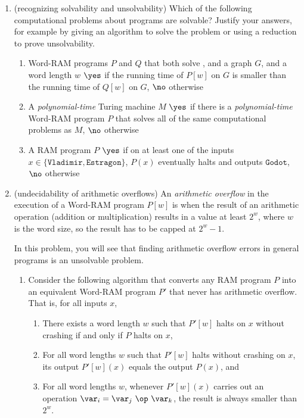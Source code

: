 \documentclass[11pt]{article}
\begin{document}
\begin{enumerate}
\item (recognizing solvability and unsolvability) Which of the following computational problems about programs are solvable?  Justify your answers, for example by giving an algorithm to solve the problem or using a reduction to prove unsolvability.
\begin{enumerate}
\item
\compprob{\WhichAlgorithmIsFaster}
{Word-RAM programs $P$ and $Q$ that both solve \GraphThreeColoring, and a graph $G$, and a word length $w$}
{$\yes$ if the running time of $P[w]$ on $G$ is smaller than the running time of $Q[w]$ on $G$, $\no$ otherwise}

\item
\compprob{\TMvsWordRAM}
{A {\em polynomial-time} Turing machine $M$}
{$\yes$ if there is a {\em polynomial-time} Word-RAM program $P$ that solves all of the same computational problems as $M$, $\no$ otherwise}

    \item
    \compprob{\WaitingForGodot}
{A RAM program $P$}
{$\yes$ if on at least one of the inputs $x\in \{\texttt{Vladimir}, \texttt{Estragon}\}$, $P(x)$ eventually halts and outputs $\texttt{Godot}$, $\no$ otherwise}

\end{enumerate}

  \item (undecidability of arithmetic overflows)
  An {\em arithmetic overflow} in the execution of a Word-RAM program $P[w]$ is when the result of an arithmetic operation (addition or multiplication) results in a value at least $2^w$, where $w$ is the word size, so the result has to be capped at $2^w-1$.

  In this problem, you will see that finding arithmetic overflow errors in general programs is an unsolvable problem.

  \begin{enumerate}
      \item Consider the following algorithm that converts any RAM program $P$ into an equivalent Word-RAM program $P'$ that never has arithmetic overflow.  That is, for all inputs $x$,
      \begin{enumerate}[label=C\arabic*]
          \item There exists a word length $w$ such that $P'[w]$ halts on $x$ without crashing if and only if $P$ halts on $x$,
          \item For all word lengths $w$ such that $P'[w]$ halts without crashing on $x$, its output $P'[w](x)$ equals the output $P(x)$, and
          \item For all word lengths $w$, whenever $P'[w](x)$ carries out an operation $\var_i = \var_j\ \op\ \var_k$, the result is always smaller than $2^w$.
      \end{enumerate}


\end{enumerate}
\end{enumerate}
\end{document}
